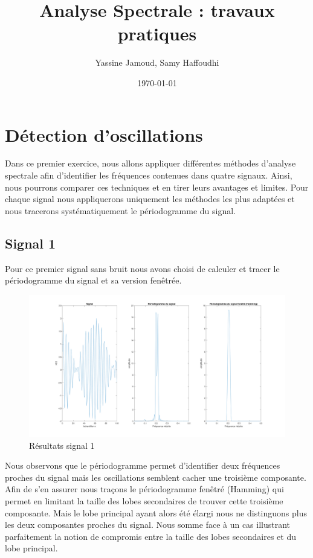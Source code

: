 \documentclass[12pt,a4paper,titlepage]{article}
\title{Analyse Spectrale : travaux pratiques}
\author{Yassine Jamoud, Samy Haffoudhi}
\date{\today}
\begin{document}
\maketitle

\section{Détection d'oscillations}

Dans ce premier exercice, nous allons appliquer différentes méthodes d'analyse spectrale afin
d'identifier les fréquences contenues dans quatre signaux. Ainsi, nous pourrons comparer ces
techniques et en tirer leurs avantages et limites. Pour chaque signal nous appliquerons uniquement
les méthodes les plus adaptées et nous tracerons systématiquement le périodogramme du signal.

\subsection*{Signal 1}

Pour ce premier signal sans bruit nous avons choisi de calculer et tracer le périodogramme du
signal et sa version fenêtrée.

\begin{figure}[H]
    \caption{Résultats signal 1}
    \includegraphics[width=\textwidth]{sig1}
    \centering
\end{figure}

Nous observons que le périodogramme permet d'identifier deux fréquences proches du signal
mais les oscillations semblent cacher une troisième composante. Afin de s'en assurer nous
traçons le périodogramme fenêtré (Hamming) qui permet en limitant la taille des lobes secondaires
de trouver cette troisième composante. Mais le lobe principal ayant alors été élargi nous ne distinguons
plus les deux composantes proches du signal. Nous somme face à un cas illustrant parfaitement la
notion de compromis entre la taille des lobes secondaires et du lobe principal.
\end{document}
